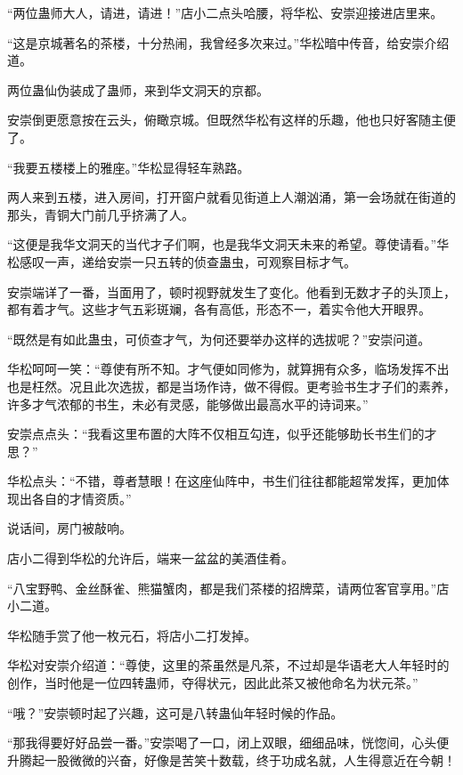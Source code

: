 
\begin{this_body}



“两位蛊师大人，请进，请进！”店小二点头哈腰，将华松、安崇迎接进店里来。

“这是京城著名的茶楼，十分热闹，我曾经多次来过。”华松暗中传音，给安崇介绍道。

两位蛊仙伪装成了蛊师，来到华文洞天的京都。

安崇倒更愿意按在云头，俯瞰京城。但既然华松有这样的乐趣，他也只好客随主便了。

“我要五楼楼上的雅座。”华松显得轻车熟路。

两人来到五楼，进入房间，打开窗户就看见街道上人潮汹涌，第一会场就在街道的那头，青铜大门前几乎挤满了人。

“这便是我华文洞天的当代才子们啊，也是我华文洞天未来的希望。尊使请看。”华松感叹一声，递给安崇一只五转的侦查蛊虫，可观察目标才气。

安崇端详了一番，当面用了，顿时视野就发生了变化。他看到无数才子的头顶上，都有着才气。这些才气五彩斑斓，各有高低，形态不一，着实令他大开眼界。

“既然是有如此蛊虫，可侦查才气，为何还要举办这样的选拔呢？”安崇问道。

华松呵呵一笑：“尊使有所不知。才气便如同修为，就算拥有众多，临场发挥不出也是枉然。况且此次选拔，都是当场作诗，做不得假。更考验书生才子们的素养，许多才气浓郁的书生，未必有灵感，能够做出最高水平的诗词来。”

安崇点点头：“我看这里布置的大阵不仅相互勾连，似乎还能够助长书生们的才思？”

华松点头：“不错，尊者慧眼！在这座仙阵中，书生们往往都能超常发挥，更加体现出各自的才情资质。”

说话间，房门被敲响。

店小二得到华松的允许后，端来一盆盆的美酒佳肴。

“八宝野鸭、金丝酥雀、熊猫蟹肉，都是我们茶楼的招牌菜，请两位客官享用。”店小二道。

华松随手赏了他一枚元石，将店小二打发掉。

华松对安崇介绍道：“尊使，这里的茶虽然是凡茶，不过却是华语老大人年轻时的创作，当时他是一位四转蛊师，夺得状元，因此此茶又被他命名为状元茶。”

“哦？”安崇顿时起了兴趣，这可是八转蛊仙年轻时候的作品。

“那我得要好好品尝一番。”安崇喝了一口，闭上双眼，细细品味，恍惚间，心头便升腾起一股微微的兴奋，好像是苦笑十数载，终于功成名就，人生得意近在今朝！


\end{this_body}
